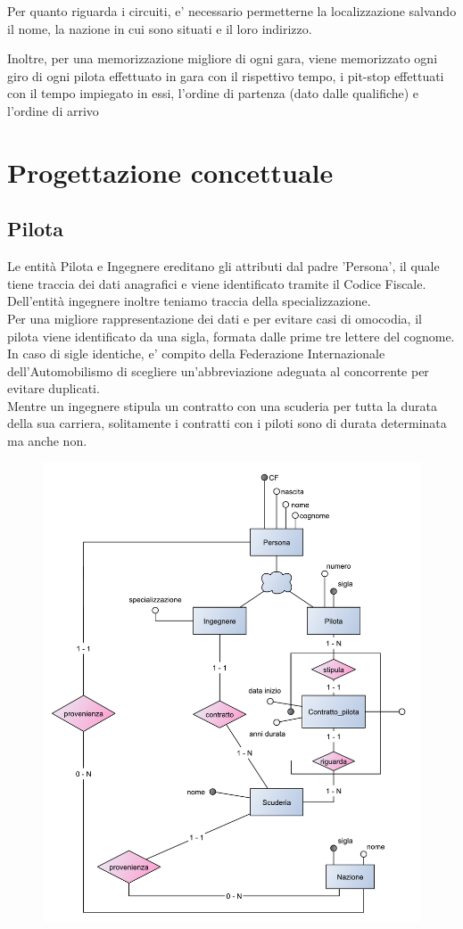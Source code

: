 \documentclass[a4paper,12pt]{report}
\begin{document}
		Per quanto riguarda i circuiti, e' necessario permetterne la localizzazione salvando il nome, la nazione in cui sono situati e il loro indirizzo.
		
		Inoltre, per una memorizzazione migliore di ogni gara, viene memorizzato ogni giro di ogni pilota effettuato in gara con il rispettivo tempo,
		i pit-stop effettuati con il tempo impiegato in essi, l'ordine di partenza (dato dalle qualifiche) e l'ordine di arrivo
	\chapter{Progettazione concettuale}
		\section{Pilota}
	Le entità Pilota e Ingegnere ereditano gli attributi dal padre 'Persona', il quale tiene traccia dei
	dati anagrafici e viene identificato tramite il Codice Fiscale.\\
	Dell'entità ingegnere inoltre teniamo traccia della specializzazione.\\
	Per una migliore rappresentazione dei dati e per evitare casi di omocodia, il pilota viene identificato
	da una sigla, formata dalle prime tre lettere del cognome. In caso di sigle identiche, e' compito della
	Federazione Internazionale dell'Automobilismo di scegliere un'abbreviazione adeguata al concorrente
	per evitare duplicati.\\
	Mentre un ingegnere stipula un contratto con una scuderia per tutta la durata della sua carriera,
	solitamente i contratti con i piloti sono di durata determinata ma anche non.
	\begin{figure}[htbp]
		\centering
		\includegraphics[scale=0.8]{copies/scheletro1.pdf}
	\end{figure}
\end{document}

